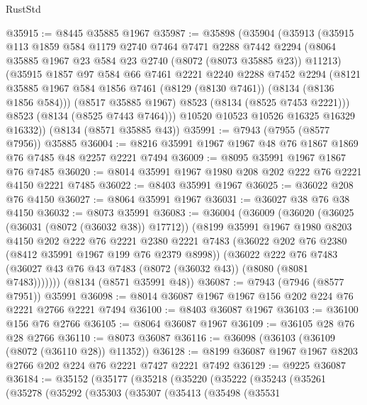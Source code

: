 \begin{lexlean}{RustStd}
\begin{coremodule}
@35915 := @8445 @35885 @1967
@35987 := @35898
    (@35904
      (@35913
        (@35915
          @113
          @1859
          @584
          @1179
          @2740
          @7464
          @7471
          @2288
          @7442
          @2294
          (@8064 @35885 @1967 @23 @584 @23 @2740 (@8072 (@8073 @35885 @23)) @11213)
          (@35915
            @1857
            @97
            @584
            @66
            @7461
            @2221
            @2240
            @2288
            @7452
            @2294
            (@8121 @35885 @1967 @584 @1856 @7461 (@8129 (@8130 @7461)) (@8134 (@8136 @1856 @584)))
            (@8517 @35885 @1967)
            @8523
            (@8134 (@8525 @7453 @2221)))
          @8523
          (@8134 (@8525 @7443 @7464)))
        @10520
        @10523
        @10526
        @16325
        @16329
        @16332))
    (@8134 (@8571 @35885 @43))
@35991 := @7943 (@7955 (@8577 @7956)) @35885
@36004 := @8216 @35991 @1967 @1967 @48 @76 @1867 @1869 @76 @7485 @48 @2257 @2221 @7494
@36009 := @8095 @35991 @1967 @1867 @76 @7485
@36020 := @8014 @35991 @1967 @1980 @208 @202 @222 @76 @2221 @4150 @2221 @7485
@36022 := @8403 @35991 @1967
@36025 := @36022 @208 @76 @4150
@36027 := @8064 @35991 @1967
@36031 := @36027 @38 @76 @38 @4150
@36032 := @8073 @35991
@36083 := @36004
    (@36009
      (@36020
        (@36025 (@36031 (@8072 (@36032 @38)) @17712))
        (@8199
          @35991
          @1967
          @1980
          @8203
          @4150
          @202
          @222
          @76
          @2221
          @2380
          @2221
          @7483
          (@36022 @202 @76 @2380 (@8412 @35991 @1967 @199 @76 @2379 @8998))
          (@36022
            @222
            @76
            @7483
            (@36027 @43 @76 @43 @7483 (@8072 (@36032 @43)) (@8080 (@8081 @7483)))))))
    (@8134 (@8571 @35991 @48))
@36087 := @7943 (@7946 (@8577 @7951)) @35991
@36098 := @8014 @36087 @1967 @1967 @156 @202 @224 @76 @2221 @2766 @2221 @7494
@36100 := @8403 @36087 @1967
@36103 := @36100 @156 @76 @2766
@36105 := @8064 @36087 @1967
@36109 := @36105 @28 @76 @28 @2766
@36110 := @8073 @36087
@36116 := @36098 (@36103 (@36109 (@8072 (@36110 @28)) @11352))
@36128 := @8199 @36087 @1967 @1967 @8203 @2766 @202 @224 @76 @2221 @7427 @2221 @7492
@36129 := @9225 @36087
@36184 := @35152
    (@35177
      (@35218
        (@35220
          (@35222
            (@35243
              (@35261
                (@35278
                  (@35292
                    (@35303
                      (@35307
                        (@35413
                          (@35498
                            (@35531

\end{coremodule}
\end{lexlean}

